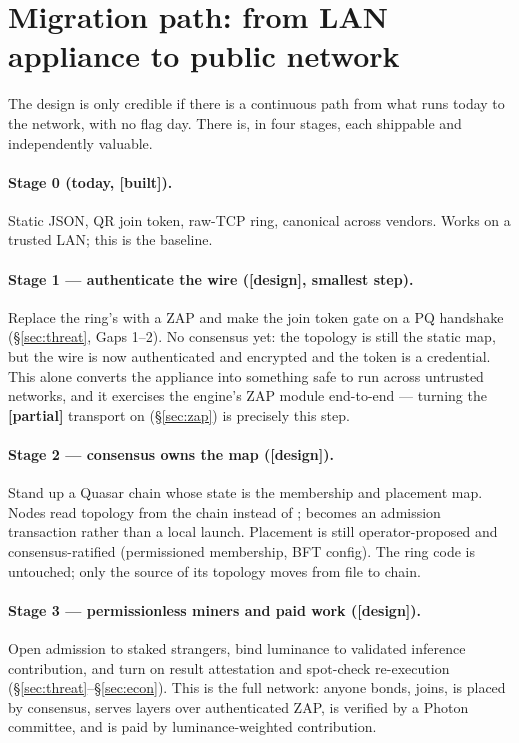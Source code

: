 \documentclass[11pt]{article}
\newcommand{\built}{\textcolor{str}{\small\textbf{[built]}}}
\newcommand{\partialb}{\textcolor{kw}{\small\textbf{[partial]}}}
\newcommand{\design}{\textcolor{cmt}{\small\textbf{[design]}}}
\begin{document}
\section{Migration path: from LAN appliance to public network}
\label{sec:migration}

The design is only credible if there is a continuous path from what runs today to the network,
with no flag day. There is, in four stages, each shippable and independently valuable.

\paragraph{Stage 0 (today, \built{}).} Static  JSON, QR join token, raw-TCP
ring, canonical  across vendors. Works on a trusted LAN; this is the baseline.

\paragraph{Stage 1 --- authenticate the wire (\design{}, smallest step).} Replace the ring's
 with a ZAP   and make the join token gate on a PQ
handshake (\S\ref{sec:threat}, Gaps 1--2). No consensus yet: the topology is still the static
map, but the wire is now authenticated and encrypted and the token is a credential. This alone
converts the appliance into something safe to run across untrusted networks, and it exercises the
engine's ZAP module end-to-end --- turning the \partialb{}  transport on
(\S\ref{sec:zap}) is precisely this step.

\paragraph{Stage 2 --- consensus owns the map (\design{}).} Stand up a Quasar chain whose state
is the membership and placement map. Nodes read topology from the chain instead of
;  becomes an admission transaction rather than
a local launch. Placement is still operator-proposed and consensus-ratified (permissioned
membership, BFT config). The ring code is untouched; only the source of its topology moves from
file to chain.

\paragraph{Stage 3 --- permissionless miners and paid work (\design{}).} Open admission to
staked strangers, bind luminance to validated inference contribution, and turn on result
attestation and spot-check re-execution (\S\ref{sec:threat}--\S\ref{sec:econ}). This is the full
network: anyone bonds, joins, is placed by consensus, serves layers over authenticated ZAP, is
verified by a Photon committee, and is paid by luminance-weighted contribution.
\end{document}
